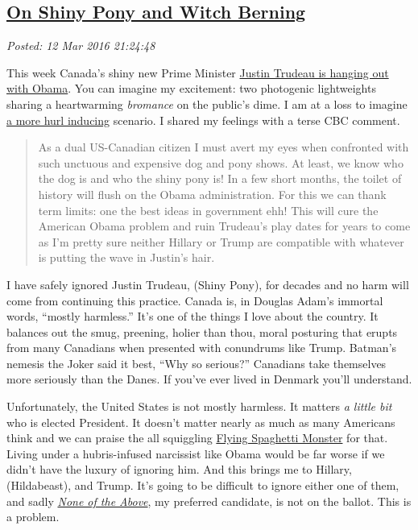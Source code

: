 %

\subsection*{\href{https://bakerjd99.wordpress.com/2016/03/12/on-shiny-pony-and-witch-berning/}{On Shiny Pony and Witch Berning}}


\noindent\emph{Posted: 12 Mar 2016 21:24:48}
\vspace{6pt}

This week Canada's shiny new Prime Minister
\href{http://www.cbc.ca/news/politics/trudeau-obama-state-visit-washington-1.3483545}{Justin
Trudeau is hanging out with Obama}. You can imagine my excitement: two
photogenic lightweights sharing a heartwarming \emph{bromance} on the
public's dime. I am at a loss to imagine
\href{https://www.youtube.com/watch?v=Mbg1nEXQ1fI}{a more hurl inducing}
scenario. I shared my feelings with a terse CBC comment.

\begin{quote}
As a dual US-Canadian citizen I must avert my eyes when confronted
with such unctuous and expensive dog and pony shows. At least, we know
who the dog is and who the shiny pony is! In a few short months, the
toilet of history will flush on the Obama administration. For this we
can thank term limits: one the best ideas in government ehh! This will
cure the American Obama problem and ruin Trudeau's play dates for years
to come as I'm pretty sure neither Hillary or Trump are compatible with
whatever is putting the wave in Justin's hair.
\end{quote}

I have safely ignored Justin Trudeau, (Shiny Pony), for decades and no
harm will come from continuing this practice. Canada is, in Douglas
Adam's immortal words, ``mostly harmless.'' It's one of the things I
love about the country. It balances out the smug, preening, holier than
thou, moral posturing that erupts from many Canadians when presented
with conundrums like Trump. Batman's nemesis the Joker said it best,
``Why so serious?'' Canadians take themselves more seriously than the
Danes. If you've ever lived in Denmark you'll understand.

Unfortunately, the United States is not mostly harmless. It matters
\emph{a little bit} who is elected President. It doesn't matter nearly
as much as many Americans think and we can praise the all squiggling
\href{http://www.venganza.org/}{Flying Spaghetti Monster} for that.
Living under a hubris-infused narcissist like Obama would be far worse
if we didn't have the luxury of ignoring him. And this brings me to
Hillary, (Hildabeast), and Trump. It's going to be difficult to ignore
either one of them, and sadly
\emph{\href{http://truthinmedia.com/none-of-the-above-to-appear-on-canadian-ballot/}{None
of the Above}}, my preferred candidate, is not on the ballot. This is a
problem.

